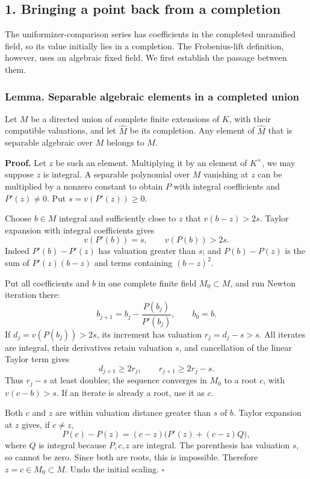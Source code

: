 \documentclass[11pt,a4paper]{article}
\begin{document}
\subsection{1. Bringing a point back from a
completion}\label{bringing-a-point-back-from-a-completion}

The uniformizer-comparison series has coefficients in the completed
unramified field, so its value initially lies in a completion. The
Frobenius-lift definition, however, uses an algebraic fixed field. We
first establish the passage between them.

\subsubsection{Lemma. Separable algebraic elements in a completed
union}\label{lemma.-separable-algebraic-elements-in-a-completed-union}

Let \(M\) be a directed union of complete finite extensions of \(K\),
with their compatible valuations, and let \(\widehat M\) be its
completion. Any element of \(\widehat M\) that is separable algebraic
over \(M\) belongs to \(M\).

\textbf{Proof.} Let \(z\) be such an element. Multiplying it by an
element of \(K^\times\), we may suppose \(z\) is integral. A separable
polynomial over \(M\) vanishing at \(z\) can be multiplied by a nonzero
constant to obtain \(P\) with integral coefficients and \(P'(z)\ne0\).
Put \(s=v(P'(z))\geq0\).

Choose \(b\in M\) integral and sufficiently close to \(z\) that
\(v(b-z)>2s\). Taylor expansion with integral coefficients gives \[
v(P'(b))=s,\qquad v(P(b))>2s.
\tag{1}
\] Indeed \(P'(b)-P'(z)\) has valuation greater than \(s\); and
\(P(b)-P(z)\) is the sum of \(P'(z)(b-z)\) and terms containing
\((b-z)^2\).

Put all coefficients and \(b\) in one complete finite field
\(M_0\subset M\), and run Newton iteration there: \[
b_{j+1}=b_j-\frac{P(b_j)}{P'(b_j)},\qquad b_0=b.
\] If \(d_j=v(P(b_j))>2s\), its increment has valuation \(r_j=d_j-s>s\).
All iterates are integral, their derivatives retain valuation \(s\), and
cancellation of the linear Taylor term gives \[
d_{j+1}\geq2r_j,\qquad r_{j+1}\geq2r_j-s.
\] Thus \(r_j-s\) at least doubles; the sequence converges in \(M_0\) to
a root \(c\), with \(v(c-b)>s\). If an iterate is already a root, use it
as \(c\).

Both \(c\) and \(z\) are within valuation distance greater than \(s\) of
\(b\). Taylor expansion at \(z\) gives, if \(c\ne z\), \[
P(c)-P(z)=(c-z)\bigl(P'(z)+(c-z)Q\bigr),
\] where \(Q\) is integral because \(P,c,z\) are integral. The
parenthesis has valuation \(s\), so cannot be zero. Since both are
roots, this is impossible. Therefore \(z=c\in M_0\subset M\). Undo the
initial scaling. \(\square\)
\end{document}
